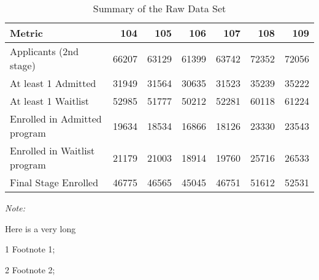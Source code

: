 \begin{table}
\centering
\caption{Summary of the Raw Data Set}
\centering
\begin{threeparttable}
\begin{tabular}[t]{lrrrrrr}
\toprule
Metric & 104 & 105 & 106 & 107 & 108 & 109\\
\midrule
Applicants (2nd stage) & 66207 & 63129 & 61399 & 63742 & 72352 & 72056\\
At least 1 Admitted & 31949 & 31564 & 30635 & 31523 & 35239 & 35222\\
At least 1 Waitlist & 52985 & 51777 & 50212 & 52281 & 60118 & 61224\\
Enrolled in Admitted program & 19634 & 18534 & 16866 & 18126 & 23330 & 23543\\
Enrolled in Waitlist program & 21179 & 21003 & 18914 & 19760 & 25716 & 26533\\
\addlinespace
Final Stage Enrolled & 46775 & 46565 & 45045 & 46751 & 51612 & 52531\\
\bottomrule
\end{tabular}
\begin{tablenotes}
\item \textit{Note: } 
\item Here is a very long
\item[1] Footnote 1; 
\item[2] Footnote 2; 
\end{tablenotes}
\end{threeparttable}
\end{table}
